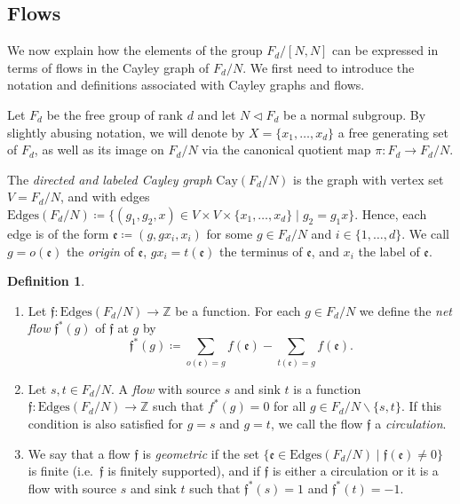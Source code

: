 \documentclass[reqno,oneside,11pt]{amsart}
\newcommand{\Z}{\mathbb{Z}}
\theoremstyle{plain}
\theoremstyle{definition}
\newtheorem{defn}[thm]{Definition} %
\begin{document}
\subsection{Flows}\label{subsection: flows}
We now explain how the elements of the group $F_d/[N,N]$ can be expressed in terms of flows in the Cayley graph of $F_d/N$. We first need to introduce the notation and definitions associated with Cayley graphs and flows.

Let $F_d$ be the free group of rank $d$ and let $N\lhd F_d$ be a normal subgroup. By slightly abusing notation, we will denote by $X=\{x_1,\ldots, x_d\}$ a free generating set of $F_d$, as well as its image on $F_d/N$ via the canonical quotient map $\pi:F_d\to F_d/N$.

The \emph{directed and labeled Cayley graph} $\mathrm{Cay}(F_d/N)$ is the graph with vertex set $V=F_d/N$, and with edges 
\(
\mathrm{Edges}(F_d/N)\coloneqq \{ (g_1,g_2,x)\in V\times V\times \{x_1,\ldots,x_d\}\mid g_2=g_1x \}.
\)
Hence, each edge is of the form $\mathfrak{e}\coloneqq (g,gx_i,x_i)$ for some $g\in F_d/N$ and $i\in \{1,\ldots,d\}$. We call $g=o(\mathfrak{e})$ the \emph{origin} of $\mathfrak{e}$, $gx_i=t(\mathfrak{e})$ the terminus of $\mathfrak{e}$, and $x_i$ the label of $\mathfrak{e}$.
\begin{defn}
	
	\begin{enumerate}
		\item Let $\mathfrak{f}:\mathrm{Edges}(F_d/N) \to \Z$ be a function. For each $g\in F_d/N$ we define the \emph{net flow} $\mathfrak{f}^{*}(g)$ of $\mathfrak{f}$ at $g$ by
		\[
		\mathfrak{f}^{*}(g)\coloneqq\sum_{o(\mathfrak{e})=g}f(\mathfrak{e})-\sum_{t(\mathfrak{e})=g}f(\mathfrak{e}).
		\]
		\item Let $s,t\in F_d/N$. A \emph{flow} with source $s$ and sink $t$ is a function $\mathfrak{f}:\mathrm{Edges}(F_d/N) \to \Z$ such that $f^{*}(g)=0$ for all $g\in F_d/N\backslash \{s,t\}$. If this condition is also satisfied for $g=s$ and $g=t$, we call the flow $\mathfrak{f}$ a \emph{circulation}.
		\item  We say that a flow $\mathfrak{f}$ is \emph{geometric} if the set $\{\mathfrak{e}\in \mathrm{Edges}(F_d/N)\mid \mathfrak{f}(\mathfrak{e})\neq 0 \}$ is finite (i.e.\ $\mathfrak{f}$ is finitely supported), and if $\mathfrak{f}$ is either a circulation or it is a flow with source $s$ and sink $t$ such that $\mathfrak{f}^{*}(s)=1$ and $\mathfrak{f}^{*}(t)=-1$.
	\end{enumerate}
\end{defn}
\end{document}
